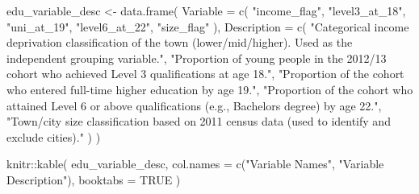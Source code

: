 \documentclass[11pt,en]{../tex/elegantpaper}
\newenvironment{Shaded}{\begin{snugshade}}{\end{snugshade}}
\newcommand{\AttributeTok}[1]{\textcolor[rgb]{0.77,0.63,0.00}{#1}}
\newcommand{\ConstantTok}[1]{\textcolor[rgb]{0.00,0.00,0.00}{#1}}
\newcommand{\FunctionTok}[1]{\textcolor[rgb]{0.00,0.00,0.81}{#1}}
\newcommand{\NormalTok}[1]{#1}
\newcommand{\OtherTok}[1]{\textcolor[rgb]{0.50,0.00,0.50}{#1}}
\newcommand{\SpecialCharTok}[1]{\textcolor[rgb]{0.00,0.00,0.00}{#1}}
\newcommand{\StringTok}[1]{\textcolor[rgb]{0.31,0.60,0.02}{#1}}
\begin{document}
\begin{Shaded}
\begin{Highlighting}[]
\NormalTok{edu\_variable\_desc }\OtherTok{\textless{}{-}} \FunctionTok{data.frame}\NormalTok{(}
  \AttributeTok{Variable =} \FunctionTok{c}\NormalTok{(}
    \StringTok{"income\_flag"}\NormalTok{,}
    \StringTok{"level3\_at\_18"}\NormalTok{,}
    \StringTok{"uni\_at\_19"}\NormalTok{,}
    \StringTok{"level6\_at\_22"}\NormalTok{,}
    \StringTok{"size\_flag"}
\NormalTok{  ),}
  \AttributeTok{Description =} \FunctionTok{c}\NormalTok{(}
    \StringTok{"Categorical income deprivation classification of the town (lower/mid/higher). Used as the independent grouping variable."}\NormalTok{,}
    \StringTok{"Proportion of young people in the 2012/13 cohort who achieved Level 3 qualifications at age 18."}\NormalTok{,}
    \StringTok{"Proportion of the cohort who entered full{-}time higher education by age 19."}\NormalTok{,}
    \StringTok{"Proportion of the cohort who attained Level 6 or above qualifications (e.g., Bachelor\textquotesingle{}s degree) by age 22."}\NormalTok{,}
    \StringTok{"Town/city size classification based on 2011 census data (used to identify and exclude cities)."}
\NormalTok{  )}
\NormalTok{)}

\NormalTok{knitr}\SpecialCharTok{::}\FunctionTok{kable}\NormalTok{(}
\NormalTok{  edu\_variable\_desc,}
  \AttributeTok{col.names =} \FunctionTok{c}\NormalTok{(}\StringTok{"Variable Names"}\NormalTok{, }\StringTok{"Variable Description"}\NormalTok{),}
  \AttributeTok{booktabs =} \ConstantTok{TRUE}
\NormalTok{)}
\end{Highlighting}
\end{Shaded}
\end{document}
